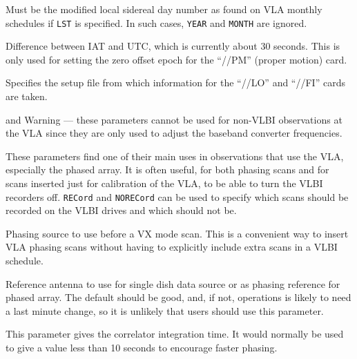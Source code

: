 \documentclass{report}
\begin{document}
\begin{list}{}{\parsep 0em  \itemsep 0em }
\item {} Must be the modified local sidereal
day number as found on VLA monthly schedules if {\tt LST} is
specified. In such cases, {\tt YEAR} and {\tt MONTH} are ignored.

\item {} Difference between IAT and UTC,
which is currently about 30 seconds. This is only used for setting the
zero offset epoch for the ``//PM'' (proper motion) card.

\item {} Specifies the setup file from
which information for the ``//LO'' and ``//FI'' cards are taken.

\item {} and 
Warning --- these parameters cannot be used for non-VLBI observations
at the VLA since they are only used to adjust the baseband converter
frequencies.

\item {} These parameters
find one of their main uses in observations that use the VLA, especially
the phased array.  It is often useful, for both phasing scans and for
scans inserted just for calibration of the VLA, to be able to turn the
VLBI recorders off.  {\tt RECord} and {\tt NORECord} can be used
to specify which scans should be recorded on the VLBI drives and which
should not be.

\item {} Phasing source to use
before a VX mode scan.  This is a convenient way to insert VLA phasing
scans without having to explicitly include extra scans in a VLBI
schedule.

\item {} Reference antenna to use
for single dish data source or as phasing reference for phased array.
The default should be good, and, if not, operations is likely to need
a last minute change, so it is unlikely that users should use this
parameter.

\item {} This parameter gives the
correlator integration time.  It would normally be used to give a
value less than 10 seconds to encourage faster phasing.


\end{list}
\end{document}
